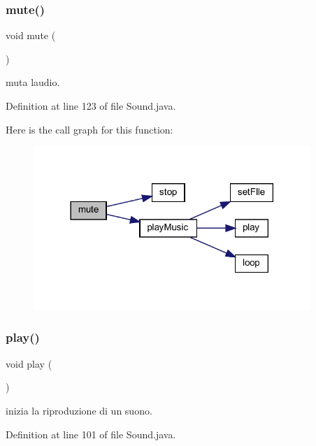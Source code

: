\subsubsection{\texorpdfstring{mute()}{mute()}}
{\footnotesize\ttfamily void mute (\begin{DoxyParamCaption}{ }\end{DoxyParamCaption})}



muta l\textquotesingle{}audio. 



Definition at line 123 of file Sound.\+java.

Here is the call graph for this function\+:\nopagebreak
\begin{figure}[H]
\begin{center}
\leavevmode
\includegraphics[width=297pt]{classprogetto_1_1_sound_a4641ac073645140bf1f9577c2587fe3b_cgraph}
\end{center}
\end{figure}
\mbox{\label{classprogetto_1_1_sound_a6d58098c6cf63c241ed03bc797256bb1}} 
\subsubsection{\texorpdfstring{play()}{play()}}
{\footnotesize\ttfamily void play (\begin{DoxyParamCaption}{ }\end{DoxyParamCaption})}



inizia la riproduzione di un suono. 



Definition at line 101 of file Sound.\+java.

